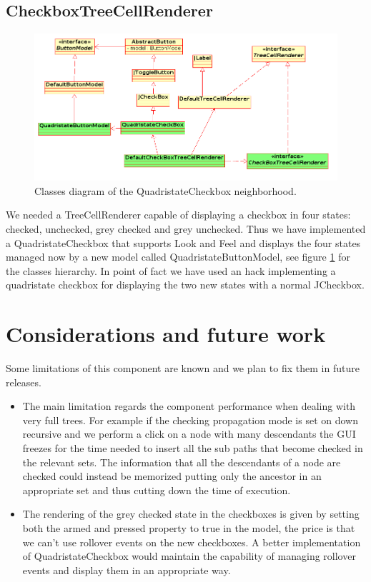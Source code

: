 \documentclass[twocolumn,desyfonts,twoside]{desypaper}  %
\newcommand{\bc}{\begin{center}}
\newcommand{\ec}{\end{center}}
\begin{document}
\subsection{CheckboxTreeCellRenderer}


\begin{figure}[]
\bc
\includegraphics[angle=0,width=1\textwidth]{dia-small-left.png}
\caption{Classes diagram of the QuadristateCheckbox neighborhood.}
\label{fig.quadristate} \ec
\end{figure}

We needed a TreeCellRenderer capable of displaying a checkbox in
four states: checked, unchecked, grey checked and grey unchecked.
Thus we have implemented a QuadristateCheckbox that supports Look
and Feel and displays the four states managed now by a new model
called QuadristateButtonModel, see figure \ref{fig.quadristate} for
the classes hierarchy. In point of fact we have used an hack
implementing a quadristate checkbox for displaying the two new
states with a normal JCheckbox.







\section{Considerations and future work}
Some limitations of this component are known and we plan to fix them
in future releases.

\begin{itemize}
\item
The main limitation regards the component performance when dealing
with very full trees. For example if the checking propagation mode
is set on down recursive and we perform a click on a node with many
descendants the GUI freezes for the time needed to insert all the
sub paths that become checked in the relevant sets. The information
that all the descendants of a node are checked could instead be
memorized putting only the ancestor in an appropriate set and thus
cutting down the time of execution.
\item
The rendering of the grey checked state in the checkboxes is given
by setting both the armed and pressed property to true in the model,
the price is that we can't use rollover events on the new
checkboxes. A better implementation of QuadristateCheckbox would
maintain the capability of managing rollover events and display them
in an appropriate way.
\end{itemize}



\end{document}

